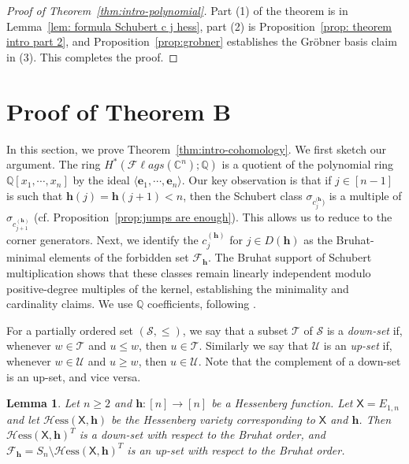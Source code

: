 \documentclass[11pt]{amsart}
\theoremstyle{plain}
\newtheorem{lem}[thm]{Lemma}
\newenvironment{theoremproof}[1]
  {\begin{proof}[Proof of Theorem~\ref{#1}]}
  {\end{proof}}
\theoremstyle{definition}
\newcommand{\Hess}{\mathcal{H}\mathrm{ess}}
\newcommand{\mx}{\mathsf{X}}
\newcommand{\hess}{{\mathbf h}}
\newcommand{\Fl}{\mathcal{F}\ell ags}
\newcommand{\C}{\mathbb{C}}           %
\newcommand{\Q}{\mathbb{ Q}}           %
\numberwithin{equation}{section}
\begin{document}
\begin{theoremproof}{thm:intro-polynomial}
Part (1) of the theorem is in Lemma~\ref{lem: formula Schubert c j hess}, part (2) is Proposition~\ref{prop: theorem intro part 2}, and Proposition~\ref{prop:grobner} establishes the Gr\"obner basis claim in (3). This completes the proof.
\end{theoremproof}




\section{Proof of Theorem B}\label{sec: theorem B}







In this section, we prove Theorem~\ref{thm:intro-cohomology}. We first sketch our argument. The ring $H^*(\Fl(\C^n);\Q)$ is a quotient of the polynomial ring $\Q[x_1,\cdots,x_n]$ by the ideal $\langle \mathbf{e}_1,\cdots,\mathbf{e}_n\rangle$.
Our key observation is that if $j \in [n-1]$ is such that $\hess(j)=\hess(j+1)<n$, then the Schubert class $\sigma_{c_{j}^{(\hess})}$ is a multiple of $\sigma_{c_{j+1}^{(\hess)}}$ (cf. Proposition~\ref{prop:jumps are enough}). This allows us to reduce to the corner generators. Next, we
identify the $c_j^{(\hess)}$ for $j \in D(\hess)$ as the Bruhat-minimal
elements of the forbidden set $\mathcal{F}_\hess$. The Bruhat support of Schubert
multiplication shows that these classes remain linearly independent
modulo positive-degree multiples of the kernel, establishing the minimality and cardinality claims. 
We use $\Q$ coefficients, following \cite{AbeCrooks}.

For a partially ordered set $(\mathcal{S},\leq)$, we say that a subset $\mathcal{T}$ of $\mathcal{S}$ is a \emph{down-set} if, whenever $w \in \mathcal{T}$ and $u \leq w$, then $u \in \mathcal{T}$. Similarly we say that $\mathcal{U}$ is an \emph{up-set} if, whenever $w \in \mathcal{U}$ and $u \geq w$, then $u \in \mathcal{U}$. Note that the complement of a down-set is an up-set, and vice versa. 


\begin{lem}\label{lem:filter}
Let $n \geq 2$ and $\hess: [n] \to [n]$ be a Hessenberg function. Let $\mx = E_{1,n}$ and let $\Hess(\mx,\hess)$ be the Hessenberg variety corresponding to $\mx$ and $\hess$. Then $\Hess(\mx,\hess)^T$ is a down-set with respect to the Bruhat order, and $\mathcal{F}_\hess = S_n \setminus \Hess(\mx,\hess)^T$ is an up-set with respect to the Bruhat order.  
\end{lem}
\end{document}
